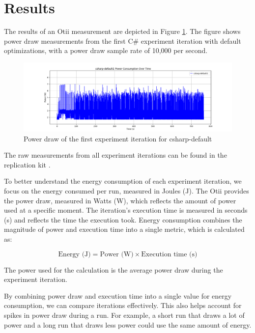\documentclass[main.tex]{subfiles}
\begin{document}
\section{Results}

The results of an Otii measurement are depicted in Figure \ref{fig:csharp-default1}. The figure shows power draw measurements from the first C\# experiment iteration with default optimizations, with a power draw sample rate of 10,000 per second.

\begin{figure}[]
    \centering
    \includegraphics[width=\linewidth]{media/results/csharp-default1.png}
    \caption{Power draw of the first experiment iteration for csharp-default}
    \label{fig:csharp-default1}
\end{figure}

The raw measurements from all experiment iterations can be found in the replication kit \cite{replication-kit-Karlsen_Landsgaard_Offenberg_Pedersen_2025}.

To better understand the energy consumption of each experiment iteration, we focus on the energy consumed per run, measured in Joules (J). The Otii provides the power draw, measured in Watts (W), which reflects the amount of power used at a specific moment. The iteration's execution time is measured in seconds (s) and reflects the time the execution took. Energy consumption combines the magnitude of power and execution time into a single metric, which is calculated as:

\[
\text{Energy (J)} = \text{Power (W)} \times \text{Execution time (s)}
\]

The power used for the calculation is the average power draw during the experiment iteration.

By combining power draw and execution time into a single value for energy consumption, we can compare iterations effectively. This also helps account for spikes in power draw during a run. For example, a short run that draws a lot of power and a long run that draws less power could use the same amount of energy. 
\end{document}
